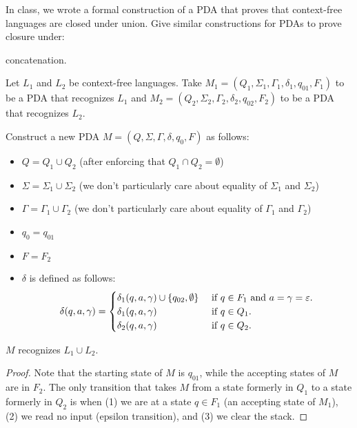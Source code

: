 \begin{problem}
  In class, we wrote a formal construction of a PDA that proves
  that context-free languages are closed under union.
  Give similar constructions for PDAs to prove closure under:
  \begin{enumalph}
    \item concatenation.
      \begin{Answer}
        Let $L_1$ and $L_2$ be context-free languages.
        Take $M_1 = (Q_1, \Sigma_1, \Gamma_1, \delta_1, q_{01}, F_1)$
        to be a PDA that recognizes $L_1$ and 
        $M_2 = (Q_2, \Sigma_2, \Gamma_2, \delta_2, q_{02}, F_2)$
        to be a PDA that recognizes $L_2$.

        \step
        Construct a new PDA $M = (Q, \Sigma, \Gamma, \delta, q_0, F)$ as follows:
        \begin{itemize}
          \item $Q = Q_1 \cup Q_2$ \quad (after enforcing that $Q_1 \cap Q_2 = \emptyset$)
          \item $\Sigma = \Sigma_1 \cup \Sigma_2$ (we don't particularly care about equality of $\Sigma_1$ and $\Sigma_2$)
          \item $\Gamma = \Gamma_1 \cup \Gamma_2$ (we don't particularly care about equality of $\Gamma_1$ and $\Gamma_2$)
          \item $q_{0} = q_{01}$
          \item $F = F_2$
          \item $\delta$ is defined as follows:
            \begin{align*}
              \delta(q, a, \gamma) = 
              \begin{cases}
                \delta_1(q, a, \gamma) \cup \left\{q_{02}, \emptyset\right\} & \text{ if $q \in F_1$ and $a = \gamma = \varepsilon$.} \\
                \delta_1(q, a, \gamma) & \text{ if $q \in Q_1$. } \\
                \delta_2(q, a, \gamma) & \text{ if $q \in Q_2$. }
              \end{cases} 
            \end{align*}
        \end{itemize}
        \begin{claim}
          $M$ recognizes $L_1 \cup L_2$.
          
          \begin{proof}
            Note that the starting state of $M$ is $q_{01}$,
            while the accepting states of $M$ are in $F_2$.
            The only transition that takes $M$ from a state formerly in $Q_1$
            to a state formerly in $Q_2$ is when (1) we are at a state $q \in F_1$
            (an accepting state of $M_1$), (2) we read no input (epsilon transition),
            and (3) we clear the stack.


\end{proof}
\end{claim}
\end{Answer}
\end{enumalph}
\end{problem}
